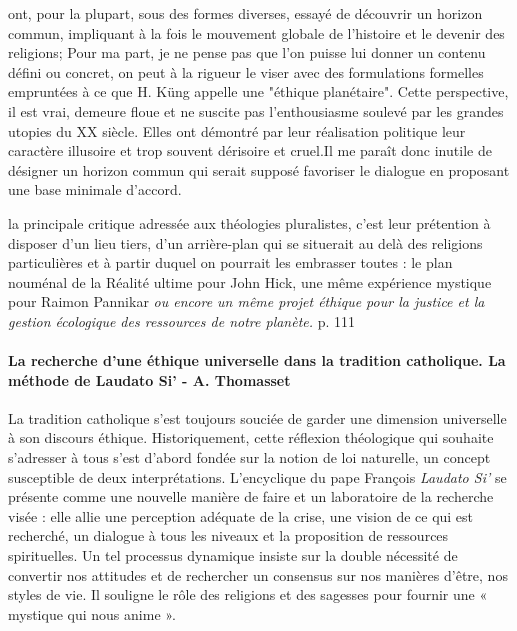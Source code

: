 \begin{singlequote}
   ont, pour la plupart, sous des formes diverses, essayé de découvrir un horizon commun, impliquant à la fois le mouvement globale de l'histoire et le devenir des religions; Pour ma part, je ne pense pas que l'on puisse lui donner un contenu défini ou concret, on peut à la rigueur le viser avec des formulations formelles empruntées à ce que H. Küng appelle une "éthique planétaire". Cette perspective, il est vrai, demeure floue et ne suscite pas l’enthousiasme soulevé par les grandes utopies du XX siècle. Elles ont démontré par leur réalisation politique leur caractère illusoire et trop souvent dérisoire et cruel.Il me paraît donc inutile de désigner un horizon commun qui serait supposé favoriser le dialogue en proposant une base minimale d'accord.   \cite[p 243]{duquoc_unique_2002}
\end{singlequote}
\begin{singlequote}
 la principale critique adressée aux théologies pluralistes, c’est leur prétention à disposer d’un lieu tiers, d’un arrière-plan qui se situerait au delà des religions particulières et à partir duquel on pourrait les embrasser toutes : le plan nouménal de la Réalité ultime pour John Hick, une même expérience mystique pour Raimon Pannikar \textit{ou encore un même projet éthique pour la justice et la gestion écologique des ressources de notre planète.}   p. 111  \cite{cheno_dieu_2017}
\end{singlequote}

\paragraph{La recherche d'une éthique universelle dans la tradition catholique. La méthode de Laudato Si’ - A. Thomasset} \cite{thomasset_recherche_2020}
\begin{singlequote}
    La tradition catholique s’est toujours souciée de garder une dimension universelle à son discours éthique. Historiquement, cette réflexion théologique qui souhaite s’adresser à tous s’est d’abord fondée sur la notion de loi naturelle, un concept susceptible de deux interprétations. L’encyclique du pape François\textit{ Laudato Si’} se présente comme une nouvelle manière de faire et un laboratoire de la recherche visée : elle allie une perception adéquate de la crise, une vision de ce qui est recherché, un dialogue à tous les niveaux et la proposition de ressources spirituelles. Un tel processus dynamique insiste sur la double nécessité de convertir nos attitudes et de rechercher un consensus sur nos manières d’être, nos styles de vie. Il souligne le rôle des religions et des sagesses pour fournir une « mystique qui nous anime ».\cite{thomasset_recherche_2020}
\end{singlequote}

